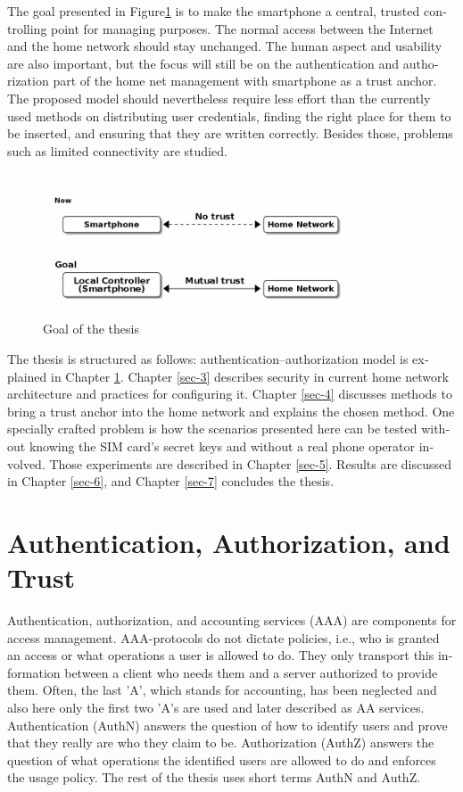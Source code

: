 \documentclass[12pt,a4paper,english]{tutthesis}
\begin{document}
\begin{otherlanguage}{english}
The goal presented in Figure\ref{fig:intro-goal} is to make the smartphone a central, trusted controlling 
point for managing purposes. The normal access between the
Internet and the home network should stay unchanged. 
The human aspect and usability are also important, but the focus will
still be on the authentication and authorization part of the home net
management with smartphone as a trust anchor.  The proposed model
should nevertheless require less effort than the currently used methods
on distributing user credentials, finding the right place for them to be
inserted, and ensuring that they are written correctly.
Besides those, problems such as limited connectivity are
studied.
\begin{figure}[htb]
\centering
\includegraphics[width=.9\linewidth]{intro-goal.png}
\caption{\label{fig:intro-goal}Goal of the thesis}
\end{figure}





The thesis is structured as follows: authentication--authorization
model is explained in Chapter \ref{sec-2}.  Chapter \ref{sec-3}
describes security in current home network architecture and 
practices for configuring it.  Chapter \ref{sec-4} discusses methods
to bring a trust anchor into the home network and explains the chosen
method.
One specially crafted problem is how the scenarios presented here can be
tested without knowing the SIM card's secret keys and without a real phone
operator involved.  Those experiments are described in Chapter \ref{sec-5}.
Results are discussed in Chapter \ref{sec-6}, and Chapter \ref{sec-7} concludes the
thesis.
\chapter{Authentication, Authorization, and Trust}
\label{sec-2}



Authentication, authorization, and accounting services (AAA) are
components for access management.  AAA-protocols do not dictate
policies, i.e., who is granted an access or what operations a user is
allowed to do. They only transport this information between a client
who needs them and a server authorized to provide them.
Often, the last 'A', which stands for accounting, has been neglected
and also here only the first two 'A's are used and later described as AA
services. Authentication (AuthN) answers the question of how to identify users and
prove that they really are who they claim to be. Authorization (AuthZ)
answers the question of what operations the identified users are allowed to do and
enforces the usage policy. The rest of the thesis uses short terms AuthN
and AuthZ.


\end{otherlanguage}
\end{document}
